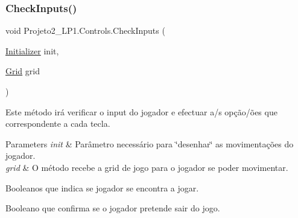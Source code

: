 \subsubsection{\texorpdfstring{Check\+Inputs()}{CheckInputs()}}
{\footnotesize\ttfamily void Projeto2\+\_\+\+L\+P1.\+Controls.\+Check\+Inputs (\begin{DoxyParamCaption}\item[{\mbox{\hyperlink{class_projeto2___l_p1_1_1_initializer}{Initializer}}}]{init,  }\item[{\mbox{\hyperlink{class_projeto2___l_p1_1_1_grid}{Grid}}}]{grid }\end{DoxyParamCaption})\hspace{0.3cm}{\ttfamily [inline]}}



Este método irá verificar o input do jogador e efectuar a/s opção/ões que correspondente a cada tecla. 


\begin{DoxyParams}{Parameters}
{\em init} & Parâmetro necessário para \char`\"{}desenhar\char`\"{} as movimentações do jogador.\\
\hline
{\em grid} & O método recebe a grid de jogo para o jogador se poder movimentar.\\
\hline
\end{DoxyParams}
Booleanos que indica se jogador se encontra a jogar.

Booleano que confirma se o jogador pretende sair do jogo.

